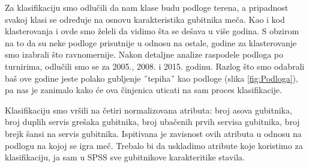 \documentclass[a4paper]{article}
\begin{document}
Za klasifikaciju smo odlučili da nam klase budu podloge terena, a pripadnost svakoj klasi se određuje na osnovu karakteristika gubitnika meča.  {\color{red}{Možda i ovde da probamo da grupišemo prvo po podlogama, pa pripadnost da gađamo na osnovu proseka?}} Kao i kod klasterovanja i ovde smo želeli da vidimo šta se dešava u više godina. S obzirom na to da su neke podloge prisutnije u odnosu na ostale, godine za klasterovanje smo izabrali što ravnomernije. Nakon detaljne analize raspodele podloga po turnirima, odlučili smo se za 2005., 2008. i 2015. godinu. Razlog što smo odabrali baš ove godine jeste polako gubljenje ˝tepiha˝ kao podloge (slika \ref{fig:Podloga}), pa nas je zanimalo kako će ova činjenica uticati na sam proces klasifikacije. 

{\color{green}Klasifikaciju smo vršili na četiri normalizovana atributa: broj asova gubitnika, broj duplih servis grešaka gubitnika,
broj ubačenih prvih servisa gubitnika, broj brejk šansi na servis gubitnika. Ispitivana je zavisnost ovih atributa u odnosu 
na podlogu na kojoj se igra meč.}  {\color{red} Trebalo bi da uskladimo atribute koje koristimo za klasifikaciju, ja sam u SPSS sve gubitnikove karakteritike stavila.} 
\end{document}
